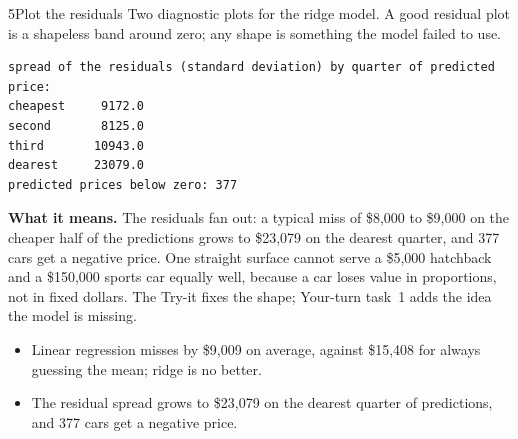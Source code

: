 \begin{labquestion}{5}{Plot the residuals}
Two diagnostic plots for the ridge model. A good residual plot is a shapeless band around zero; any shape is something the model failed to use.
\end{labquestion}
\begin{labanswer}


\begin{refoutput}
\begin{lstlisting}[style=utpterminal]
spread of the residuals (standard deviation) by quarter of predicted price:
cheapest     9172.0
second       8125.0
third       10943.0
dearest     23079.0
predicted prices below zero: 377
\end{lstlisting}
\end{refoutput}

\textbf{What it means.} The residuals fan out: a typical miss of \$8,000 to \$9,000 on the cheaper half of the predictions grows to \$23,079 on the dearest quarter, and 377 cars get a negative price. One straight surface cannot serve a \$5,000 hatchback and a \$150,000 sports car equally well, because a car loses value in proportions, not in fixed dollars. The Try-it fixes the shape; Your-turn task~1 adds the idea the model is missing.
\end{labanswer}

\begin{labcheckpoint}
\begin{itemize}[leftmargin=1.2em,itemsep=2pt,topsep=1pt]
  \item Linear regression misses by \$9,009 on average, against \$15,408 for always guessing the mean; ridge is no better.
  \item The residual spread grows to \$23,079 on the dearest quarter of predictions, and 377 cars get a negative price.
\end{itemize}
\end{labcheckpoint}


